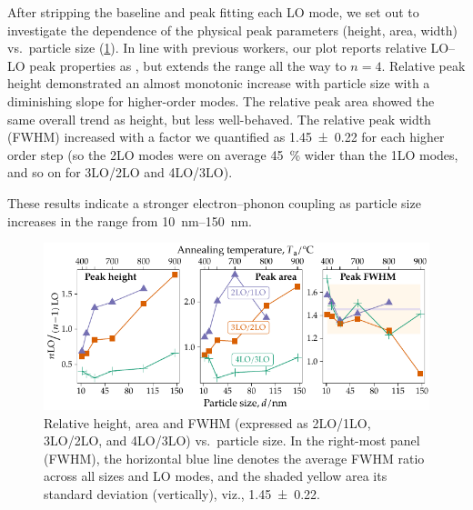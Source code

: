 \documentclass[webedition,openright,titles,swedish,english]{LuaUUThesis}\usepackage[]{graphicx}\usepackage[]{xcolor}
\newenvironment{knitrout}{}{} %
\newcommand{\viz}{viz.}
\newcommand{\vs}{vs.}
\begin{document}
After stripping the baseline and peak fitting each LO mode, we set out to
investigate the dependence of the physical peak parameters (height, area, width)
\vs\ particle size (\cref{fig:P25-UVRaman-heightLOLO-areaLOLO-fwhmLOLO-vs-diameter}).
In line with previous workers, our plot reports relative LO--LO peak properties
as  \cite{Cheng2006,Fan2012,Gandhi2018,Ojha2014,Shinde2010,Wang2004a,Hsieh2005}, but extends the range all the way to $n=4$.
Relative peak height demonstrated an almost monotonic increase with particle size
with a diminishing slope for higher-order modes.
The relative peak area showed the same overall trend as height, but less well-behaved.
The relative peak width (\gls{FWHM}) increased with a factor we quantified as
\num{1.45+-0.22} for each higher order step (so the 2LO modes were on average
\qty{45}{\percent} wider than the 1LO modes, and so on for 3LO/2LO and 4LO/3LO).

These results indicate a stronger electron--phonon coupling as particle size increases
in the range from \qtyrange{10}{150}{\nm}.


\begin{figure}[tbp]
\centering
\begin{knitrout}\scriptsize
{}\color{fgcolor}

{\centering \includegraphics[width=4.72in]{figure/0525P-fig-UVRaman-heightLOLO-areaLOLO-fwhmLOLO-vs-diameter-1} 

}


\end{knitrout}
\caption[Relative peak parameters \vs\ particle size for \ZnO]{%
   Relative height, area and \protect\gls{FWHM} (expressed as 2LO/1LO, 3LO/2LO, and 4LO/3LO)
   \vs\ particle size.
   In the right-most panel (\protect\gls{FWHM}), the horizontal blue line denotes the
   average \protect\gls{FWHM} ratio across all sizes and LO modes, and the shaded
   yellow area its standard deviation (vertically), \viz, \num{1.45+-0.22}.}
\label{fig:P25-UVRaman-heightLOLO-areaLOLO-fwhmLOLO-vs-diameter}
\end{figure}
\end{document}
